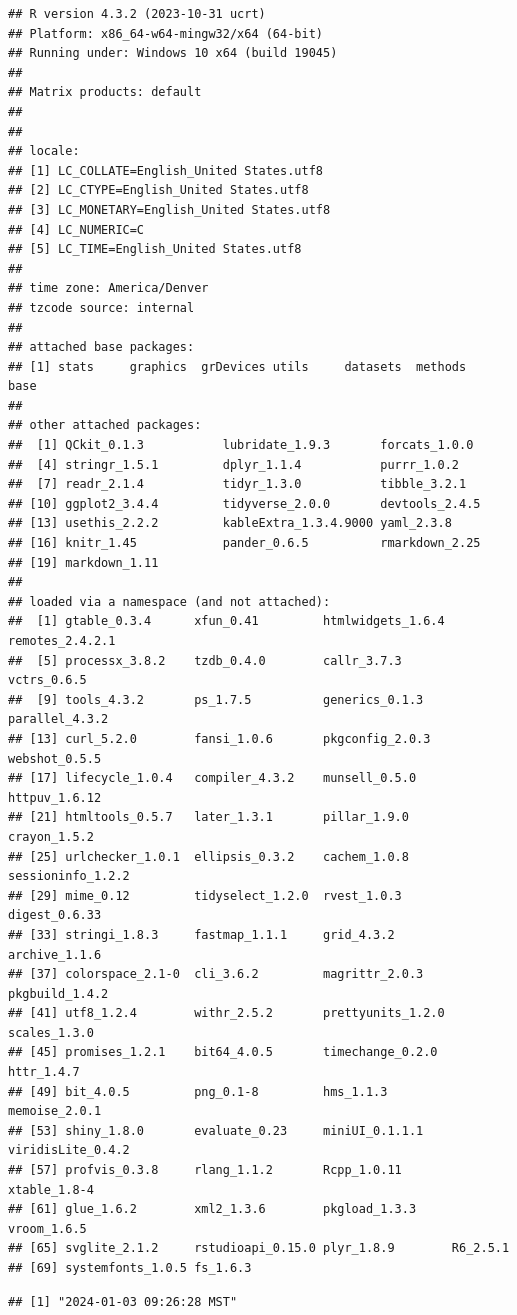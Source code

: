 \documentclass[
]{article}
\begin{document}
\begin{verbatim}
## R version 4.3.2 (2023-10-31 ucrt)
## Platform: x86_64-w64-mingw32/x64 (64-bit)
## Running under: Windows 10 x64 (build 19045)
## 
## Matrix products: default
## 
## 
## locale:
## [1] LC_COLLATE=English_United States.utf8 
## [2] LC_CTYPE=English_United States.utf8   
## [3] LC_MONETARY=English_United States.utf8
## [4] LC_NUMERIC=C                          
## [5] LC_TIME=English_United States.utf8    
## 
## time zone: America/Denver
## tzcode source: internal
## 
## attached base packages:
## [1] stats     graphics  grDevices utils     datasets  methods   base     
## 
## other attached packages:
##  [1] QCkit_0.1.3           lubridate_1.9.3       forcats_1.0.0        
##  [4] stringr_1.5.1         dplyr_1.1.4           purrr_1.0.2          
##  [7] readr_2.1.4           tidyr_1.3.0           tibble_3.2.1         
## [10] ggplot2_3.4.4         tidyverse_2.0.0       devtools_2.4.5       
## [13] usethis_2.2.2         kableExtra_1.3.4.9000 yaml_2.3.8           
## [16] knitr_1.45            pander_0.6.5          rmarkdown_2.25       
## [19] markdown_1.11        
## 
## loaded via a namespace (and not attached):
##  [1] gtable_0.3.4      xfun_0.41         htmlwidgets_1.6.4 remotes_2.4.2.1  
##  [5] processx_3.8.2    tzdb_0.4.0        callr_3.7.3       vctrs_0.6.5      
##  [9] tools_4.3.2       ps_1.7.5          generics_0.1.3    parallel_4.3.2   
## [13] curl_5.2.0        fansi_1.0.6       pkgconfig_2.0.3   webshot_0.5.5    
## [17] lifecycle_1.0.4   compiler_4.3.2    munsell_0.5.0     httpuv_1.6.12    
## [21] htmltools_0.5.7   later_1.3.1       pillar_1.9.0      crayon_1.5.2     
## [25] urlchecker_1.0.1  ellipsis_0.3.2    cachem_1.0.8      sessioninfo_1.2.2
## [29] mime_0.12         tidyselect_1.2.0  rvest_1.0.3       digest_0.6.33    
## [33] stringi_1.8.3     fastmap_1.1.1     grid_4.3.2        archive_1.1.6    
## [37] colorspace_2.1-0  cli_3.6.2         magrittr_2.0.3    pkgbuild_1.4.2   
## [41] utf8_1.2.4        withr_2.5.2       prettyunits_1.2.0 scales_1.3.0     
## [45] promises_1.2.1    bit64_4.0.5       timechange_0.2.0  httr_1.4.7       
## [49] bit_4.0.5         png_0.1-8         hms_1.1.3         memoise_2.0.1    
## [53] shiny_1.8.0       evaluate_0.23     miniUI_0.1.1.1    viridisLite_0.4.2
## [57] profvis_0.3.8     rlang_1.1.2       Rcpp_1.0.11       xtable_1.8-4     
## [61] glue_1.6.2        xml2_1.3.6        pkgload_1.3.3     vroom_1.6.5      
## [65] svglite_2.1.2     rstudioapi_0.15.0 plyr_1.8.9        R6_2.5.1         
## [69] systemfonts_1.0.5 fs_1.6.3
\end{verbatim}

\begin{verbatim}
## [1] "2024-01-03 09:26:28 MST"
\end{verbatim}
\end{document}
